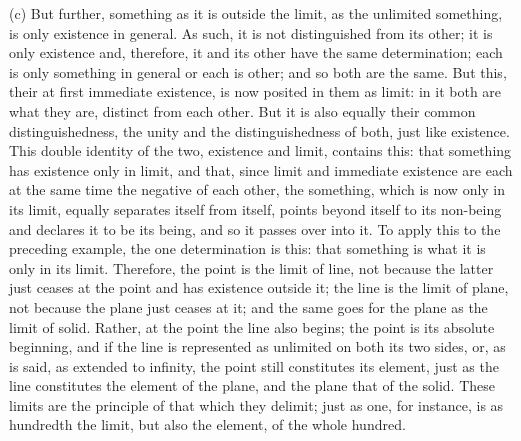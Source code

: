 (c) But further, something as it is outside the limit,
as the unlimited something, is only existence in general.
As such, it is not distinguished from its other;
it is only existence
and, therefore, it and its other have the same determination;
each is only something in general or each is other;
and so both are the same.
But this, their at first immediate existence,
is now posited in them as limit:
in it both are what they are, distinct from each other.
But it is also equally their common distinguishedness,
the unity and the distinguishedness of both,
just like existence.
This double identity of the two,
existence and limit, contains this:
that something has existence only in limit,
and that, since limit and immediate existence are each
at the same time the negative of each other,
the something, which is now only in its limit,
equally separates itself from itself,
points beyond itself to its non-being
and declares it to be its being,
and so it passes over into it.
To apply this to the preceding example,
the one determination is this:
that something is what it is only in its limit.
Therefore, the point is the limit of line,
not because the latter just ceases at the point
and has existence outside it;
the line is the limit of plane,
not because the plane just ceases at it;
and the same goes for the plane as the limit of solid.
Rather, at the point the line also begins;
the point is its absolute beginning,
and if the line is represented
as unlimited on both its two sides,
or, as is said, as extended to infinity,
the point still constitutes its element,
just as the line constitutes the element of the plane,
and the plane that of the solid.
These limits are the principle
of that which they delimit;
just as one, for instance,
is as hundredth the limit,
but also the element,
of the whole hundred.

